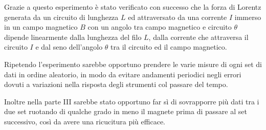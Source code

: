 {\fontsize{12}{14}\selectfont 

Grazie a questo esperimento è stato verificato con successo che la forza di Lorentz generata da un circuito di lunghezza $L$ ed attraversato da una corrente $I$ immerso in un campo magnetico $B$ con un angolo tra campo magnetico e circuito $\theta$ dipende linearmente dalla lunghezza del filo $L$, dalla corrente che attraversa il circuito $I$ e dal seno dell'angolo $\theta$ tra il circuito ed il campo magnetico.
\par
Ripetendo l'esperimento sarebbe opportuno prendere le varie misure di ogni set di dati in ordine aleatorio, in modo da evitare andamenti periodici negli errori dovuti a variazioni nella risposta degli strumenti col passare del tempo.
\par
Inoltre nella parte III sarebbe stato opportuno far sì di sovrapporre più dati tra i due set ruotando di qualche grado in meno il magnete prima di passare al set successivo, così da avere una ricucitura più efficace.


\par}
